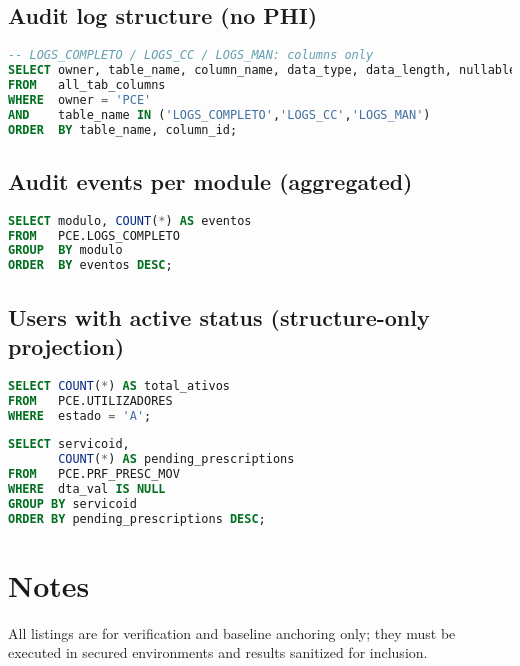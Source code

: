\subsection*{Audit log structure (no PHI)}
\begin{lstlisting}[language=SQL]
-- LOGS_COMPLETO / LOGS_CC / LOGS_MAN: columns only
SELECT owner, table_name, column_name, data_type, data_length, nullable
FROM   all_tab_columns
WHERE  owner = 'PCE'
AND    table_name IN ('LOGS_COMPLETO','LOGS_CC','LOGS_MAN')
ORDER  BY table_name, column_id;
\end{lstlisting}

\subsection*{Audit events per module (aggregated)}
\begin{lstlisting}[language=SQL]
SELECT modulo, COUNT(*) AS eventos
FROM   PCE.LOGS_COMPLETO
GROUP  BY modulo
ORDER  BY eventos DESC;
\end{lstlisting}

\subsection*{Users with active status (structure-only projection)}
\begin{lstlisting}[language=SQL]
SELECT COUNT(*) AS total_ativos
FROM   PCE.UTILIZADORES
WHERE  estado = 'A';
\end{lstlisting}
\begin{lstlisting}[language=SQL]
SELECT servicoid,
       COUNT(*) AS pending_prescriptions
FROM   PCE.PRF_PRESC_MOV
WHERE  dta_val IS NULL
GROUP BY servicoid
ORDER BY pending_prescriptions DESC;
\end{lstlisting}

\endgroup
\section{Notes}
All listings are for verification and baseline anchoring only; they must be executed in secured environments and results sanitized for inclusion.